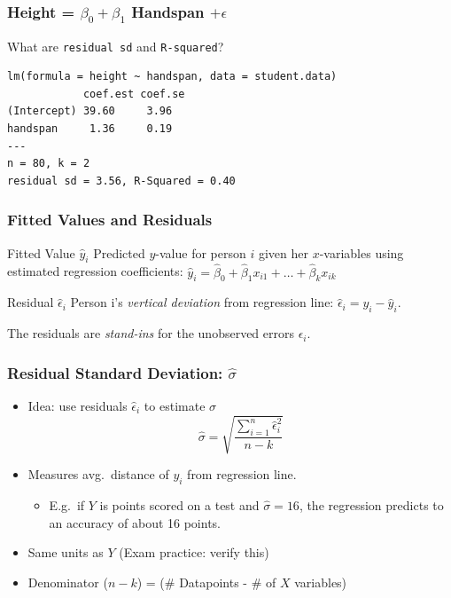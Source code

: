 \documentclass[handout]{beamer}
\begin{document}
\begin{frame}[fragile]
\frametitle{Height = $\beta_0 + \beta_1$ Handspan $+ \epsilon$}
\alert{What are \texttt{residual sd} and \texttt{R-squared}?}
\footnotesize
\begin{verbatim}
lm(formula = height ~ handspan, data = student.data)
            coef.est coef.se
(Intercept) 39.60     3.96  
handspan     1.36     0.19  
---
n = 80, k = 2
residual sd = 3.56, R-Squared = 0.40
\end{verbatim}
\end{frame}

\begin{frame}
\frametitle{Fitted Values and Residuals}

\begin{block}{Fitted Value $\widehat{y}_i$}
Predicted $y$-value for person $i$ given her $x$-variables using estimated regression coefficients: \alert{$\widehat{y}_i = \widehat{\beta}_0 + \widehat{\beta}_1 x_{i1} + \hdots + \widehat{\beta}_k x_{ik}$}
\end{block}


\begin{block}{Residual $\widehat{\epsilon}_i$}
  Person i's \emph{vertical deviation} from regression line: \alert{$\widehat{\epsilon}_i = y_i - \widehat{y}_i$}. 
\end{block}

\vspace{1em}
\alert{The residuals are \emph{stand-ins} for the unobserved errors $\epsilon_i$.}

\end{frame}
\begin{frame}
\frametitle{Residual Standard Deviation: $\widehat{\sigma}$}
	\begin{itemize}
    \item Idea: use residuals $\widehat{\epsilon}_i$ to estimate $\sigma$
	$$\widehat{\sigma}  = \sqrt{\frac{\sum_{i=1}^n \widehat{\epsilon}_i^2}{n -k}}$$ 
		\item Measures avg.\ distance of $y_i$ from regression line.
				\begin{itemize}
					\item E.g.\ if $Y$ is points scored on a test and $\widehat{\sigma}=16$, the regression predicts to an accuracy of about 16 points. 
				\end{itemize}
	\item Same units as $Y$ (Exam practice: verify this) 
	\item Denominator  ($n-k$) = (\# Datapoints - \# of $X$ variables) 
	\end{itemize}

\end{frame}
\end{document}
